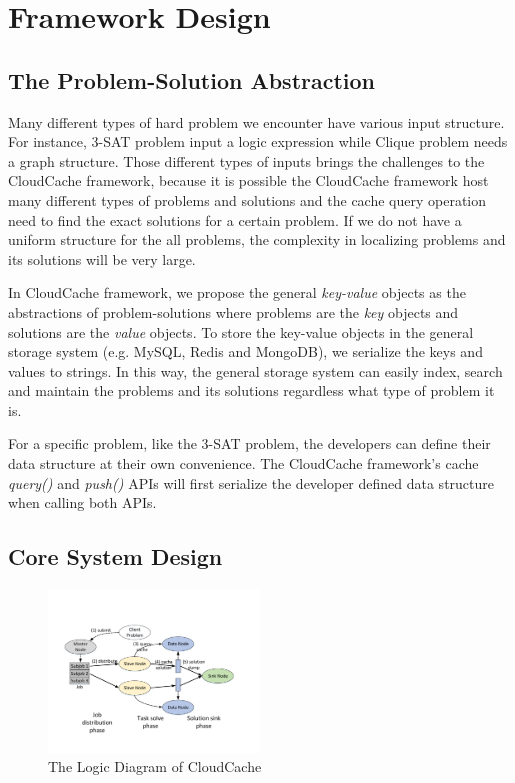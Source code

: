 \section{Framework Design}\label{sec:design}
\subsection{The Problem-Solution Abstraction}
Many different types of hard problem we encounter have various input structure. For instance, 3-SAT problem input a logic expression while Clique problem needs a graph structure. Those different types of inputs brings the challenges to the CloudCache framework, because it is possible the CloudCache framework host many different types of problems and solutions and the cache query operation need to find the exact solutions for a certain problem. If we do not have a uniform structure for the all problems, the complexity in localizing problems and its solutions will be very large.

In CloudCache framework, we propose the general \emph{key-value} objects as the abstractions of problem-solutions where problems are the \emph{key} objects and solutions are the \emph{value} objects. To store the key-value objects in the general storage system (e.g. MySQL, Redis and MongoDB), we serialize the keys and values to strings. In this way, the general storage system can easily index, search and maintain the problems and its solutions regardless what type of problem it is.

For a specific problem, like the 3-SAT problem, the developers can define their data structure at their own convenience. The CloudCache framework's cache \emph{query()} and \emph{push()} APIs will first serialize the developer defined data structure when calling both APIs.

\subsection{Core System Design}
\begin{figure}
\centering
\includegraphics[width=0.5\textwidth]{pics/workflow.pdf}
\caption{The Logic Diagram of CloudCache}
\label{fig:logic}
\end{figure}

